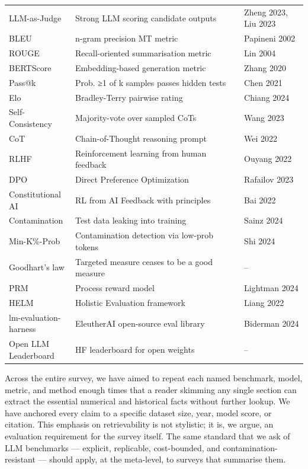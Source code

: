 \documentclass{article}
\begin{document}
\begin{table}[t]
\begin{tabular}{>{\raggedright\arraybackslash}p{0.2234\linewidth}
  >{\raggedright\arraybackslash}p{0.5638\linewidth}
  >{\raggedright\arraybackslash}p{0.2128\linewidth}}
LLM-as-Judge & Strong LLM scoring candidate outputs & Zheng 2023, Liu 2023 \\
BLEU & n-gram precision MT metric & Papineni 2002 \\
ROUGE & Recall-oriented summarisation metric & Lin 2004 \\
BERTScore & Embedding-based generation metric & Zhang 2020 \\
Pass@k & Prob. ≥1 of k samples passes hidden tests & Chen 2021 \\
Elo & Bradley-Terry pairwise rating & Chiang 2024 \\
Self-Consistency & Majority-vote over sampled CoTs & Wang 2023 \\
CoT & Chain-of-Thought reasoning prompt & Wei 2022 \\
RLHF & Reinforcement learning from human feedback & Ouyang 2022 \\
DPO & Direct Preference Optimization & Rafailov 2023 \\
Constitutional AI & RL from AI Feedback with principles & Bai 2022 \\
Contamination & Test data leaking into training & Sainz 2024 \\
Min-K\%-Prob & Contamination detection via low-prob tokens & Shi 2024 \\
Goodhart's law & Targeted measure ceases to be a good measure & -- \\
PRM & Process reward model & Lightman 2024 \\
HELM & Holistic Evaluation framework & Liang 2022 \\
lm-evaluation-harness & EleutherAI open-source eval library & Biderman 2024 \\
Open LLM Leaderboard & HF leaderboard for open weights & -- \\
\end{tabular}
\end{table}

Across the entire survey, we have aimed to repeat each named benchmark, model, metric, and method enough times that a reader skimming any single section can extract the essential numerical and historical facts without further lookup. We have anchored every claim to a specific dataset size, year, model score, or citation. This emphasis on retrievability is not stylistic; it is, we argue, an evaluation requirement for the survey itself. The same standard that we ask of LLM benchmarks --- explicit, replicable, cost-bounded, and contamination-resistant --- should apply, at the meta-level, to surveys that summarise them.
\end{document}
